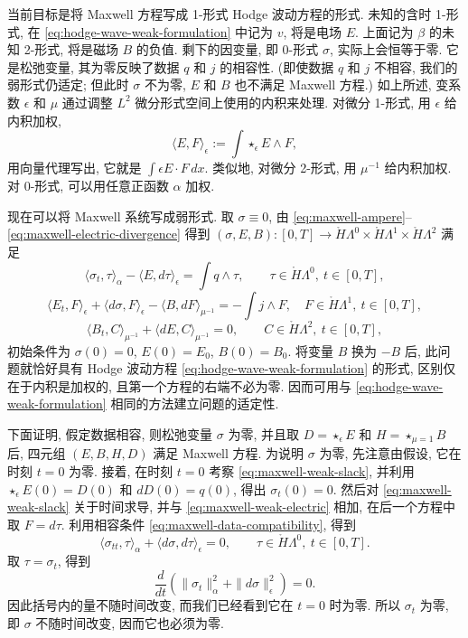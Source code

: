 {当前目标是将 Maxwell 方程写成 1-形式 Hodge 波动方程的形式. 未知的含时 1-形式, 在 \eqref{eq:hodge-wave-weak-formulation} 中记为 $v$, 将是电场 $E$. 上面记为 $\beta$ 的未知 2-形式, 将是磁场 $B$ 的负值. 剩下的因变量, 即 0-形式 $\sigma$, 实际上会恒等于零. 它是松弛变量, 其为零反映了数据 $q$ 和 $j$ 的相容性. (即使数据 $q$ 和 $j$ 不相容, 我们的弱形式仍适定; 但此时 $\sigma$ 不为零, $E$ 和 $B$ 也不满足 Maxwell 方程.) 如上所述, 变系数 $\epsilon$ 和 $\mu$ 通过调整 $L^2$ 微分形式空间上使用的内积来处理. 对微分 1-形式, 用 $\epsilon$ 给内积加权,}
\[
\langle E,F\rangle_\epsilon:=\int\star_\epsilon E\wedge F,
\]
{用向量代理写出, 它就是 $\int\epsilon E\cdot F\,dx$. 类似地, 对微分 2-形式, 用 $\mu^{-1}$ 给内积加权. 对 0-形式, 可以用任意正函数 $\alpha$ 加权.}

{现在可以将 Maxwell 系统写成弱形式. 取 $\sigma\equiv0$, 由 \eqref{eq:maxwell-ampere}--\eqref{eq:maxwell-electric-divergence} 得到 $(\sigma,E,B):[0,T]\to\mathring H\Lambda^0\times\mathring H\Lambda^1\times\mathring H\Lambda^2$ 满足}
\begin{equation}\label{eq:maxwell-weak-slack}
\langle\sigma_t,\tau\rangle_\alpha-\langle E,d\tau\rangle_\epsilon=\int q\wedge\tau,\qquad\tau\in\mathring H\Lambda^0,\ t\in[0,T],
\end{equation}
\begin{equation}\label{eq:maxwell-weak-electric}
\langle E_t,F\rangle_\epsilon+\langle d\sigma,F\rangle_\epsilon-\langle B,dF\rangle_{\mu^{-1}}=-\int j\wedge F,\quad F\in\mathring H\Lambda^1,\ t\in[0,T],
\end{equation}
\begin{equation}\label{eq:maxwell-weak-magnetic}
\langle B_t,C\rangle_{\mu^{-1}}+\langle dE,C\rangle_{\mu^{-1}}=0,\qquad C\in\mathring H\Lambda^2,\ t\in[0,T],
\end{equation}
{初始条件为 $\sigma(0)=0$, $E(0)=E_0$, $B(0)=B_0$. 将变量 $B$ 换为 $-B$ 后, 此问题就恰好具有 Hodge 波动方程 \eqref{eq:hodge-wave-weak-formulation} 的形式, 区别仅在于内积是加权的, 且第一个方程的右端不必为零. 因而可用与 \eqref{eq:hodge-wave-weak-formulation} 相同的方法建立问题的适定性.}

{下面证明, 假定数据相容, 则松弛变量 $\sigma$ 为零, 并且取 $D=\star_\epsilon E$ 和 $H=\star_{\mu=1}B$ 后, 四元组 $(E,B,H,D)$ 满足 Maxwell 方程. 为说明 $\sigma$ 为零, 先注意由假设, 它在时刻 $t=0$ 为零. 接着, 在时刻 $t=0$ 考察 \eqref{eq:maxwell-weak-slack}, 并利用 $\star_\epsilon E(0)=D(0)$ 和 $dD(0)=q(0)$, 得出 $\sigma_t(0)=0$. 然后对 \eqref{eq:maxwell-weak-slack} 关于时间求导, 并与 \eqref{eq:maxwell-weak-electric} 相加, 在后一个方程中取 $F=d\tau$. 利用相容条件 \eqref{eq:maxwell-data-compatibility}, 得到}
\[
\langle\sigma_{tt},\tau\rangle_\alpha+\langle d\sigma,d\tau\rangle_\epsilon=0,\qquad\tau\in\mathring H\Lambda^0,\ t\in[0,T].
\]
{取 $\tau=\sigma_t$, 得到}
\[
\frac d{dt}(\|\sigma_t\|_\alpha^2+\|d\sigma\|_\epsilon^2)=0.
\]
{因此括号内的量不随时间改变, 而我们已经看到它在 $t=0$ 时为零. 所以 $\sigma_t$ 为零, 即 $\sigma$ 不随时间改变, 因而它也必须为零.}

